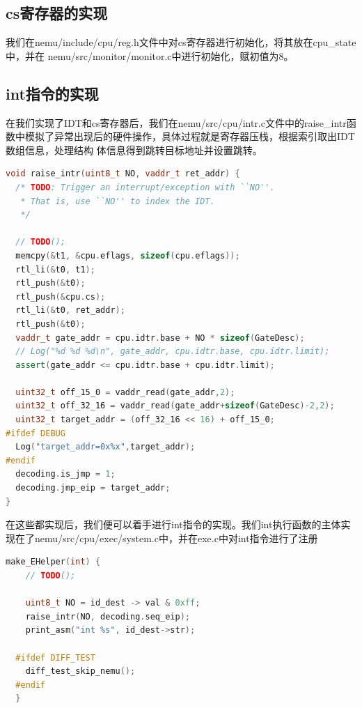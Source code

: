\documentclass[UTF8,a4paper,10pt]{ctexart}
\begin{document}
\subsection{cs寄存器的实现}
我们在nemu/include/cpu/reg.h文件中对cs寄存器进行初始化，将其放在cpu\_state中，并在
nemu/src/monitor/monitor.c中进行初始化，赋初值为8。
\subsection{int指令的实现}
在我们实现了IDT和cs寄存器后，我们在nemu/src/cpu/intr.c文件中的raise\_intr函数中模拟了异常出现后的硬件操作，具体过程就是寄存器压栈，根据索引取出IDT数组信息，处理结构
体信息得到跳转目标地址并设置跳转。
\begin{lstlisting}[language = C++]
void raise_intr(uint8_t NO, vaddr_t ret_addr) {
  /* TODO: Trigger an interrupt/exception with ``NO''.
   * That is, use ``NO'' to index the IDT.
   */

  // TODO();
  memcpy(&t1, &cpu.eflags, sizeof(cpu.eflags));
  rtl_li(&t0, t1);
  rtl_push(&t0);
  rtl_push(&cpu.cs);
  rtl_li(&t0, ret_addr);
  rtl_push(&t0);
  vaddr_t gate_addr = cpu.idtr.base + NO * sizeof(GateDesc);
  // Log("%d %d %d\n", gate_addr, cpu.idtr.base, cpu.idtr.limit);
  assert(gate_addr <= cpu.idtr.base + cpu.idtr.limit);

  uint32_t off_15_0 = vaddr_read(gate_addr,2);
  uint32_t off_32_16 = vaddr_read(gate_addr+sizeof(GateDesc)-2,2);
  uint32_t target_addr = (off_32_16 << 16) + off_15_0;
#ifdef DEBUG
  Log("target_addr=0x%x",target_addr);
#endif
  decoding.is_jmp = 1;
  decoding.jmp_eip = target_addr;
}
\end{lstlisting}
在这些都实现后，我们便可以着手进行int指令的实现。我们int执行函数的主体实现在了nemu/src/cpu/exec/system.c中，并在exe.c中对int指令进行了注册
\begin{lstlisting}[language = C++]
make_EHelper(int) {
    // TODO();
  
    uint8_t NO = id_dest -> val & 0xff;
    raise_intr(NO, decoding.seq_eip);
    print_asm("int %s", id_dest->str);
  
  #ifdef DIFF_TEST
    diff_test_skip_nemu();
  #endif
  }
\end{lstlisting}
\end{document}
